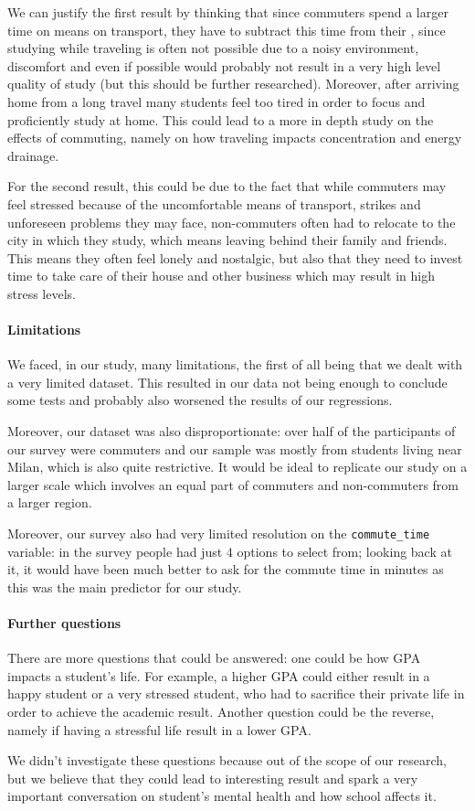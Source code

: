 \documentclass[11pt]{extarticle}
\numberwithin{table}{section}
\numberwithin{figure}{section}
\numberwithin{equation}{section}
\begin{document}
We can justify the first result by thinking that since commuters spend a larger time on
means on transport, they have to subtract this time from their ,
since studying while traveling is often not possible due to a noisy environment,
discomfort and even if possible would probably not result in a very high level quality of study
(but this should be further researched).
Moreover, after arriving home from a long travel many students feel too tired in order to focus
and proficiently study at home.
This could lead to a more in depth study on the effects of commuting,
namely on how traveling impacts concentration and energy drainage.

For the second result, this could be due to the fact that while commuters may feel stressed
because of the uncomfortable means of transport, strikes and unforeseen problems they may face,
non-commuters often had to relocate to the city in which they study,
which means leaving behind their family and friends.
This means they often feel lonely and nostalgic, but also that they need to invest time
to take care of their house and other business which may result in high stress levels.

\paragraph{Limitations}
We faced, in our study, many limitations, the first of all being that we dealt with
a very limited dataset.
This resulted in our data not being enough to conclude some tests and
probably also worsened the results of our regressions.

Moreover, our dataset was also disproportionate: over half of the participants
of our survey were commuters and our sample was mostly from students living near Milan,
which is also quite restrictive.
It would be ideal to replicate our study on a larger scale which involves an equal part
of commuters and non-commuters from a larger region.

Moreover, our survey also had very limited resolution on the \texttt{commute\_time} variable:
in the survey people had just $4$ options to select from; looking back at it, it would have been
much better to ask for the commute time in minutes as this was the main predictor for our study.

\paragraph{Further questions}
There are more questions that could be answered: one could be how GPA impacts a student’s life.
For example, a higher GPA could either result in a happy student or a very stressed student,
who had to sacrifice their private life in order to achieve the academic result.
Another question could be the reverse, namely if having a stressful life result in a lower GPA.

We didn’t investigate these questions because out of the scope of our research,
but we believe that they could lead to interesting result and spark a very important conversation
on student’s mental health and how school affects it.
\end{document}
